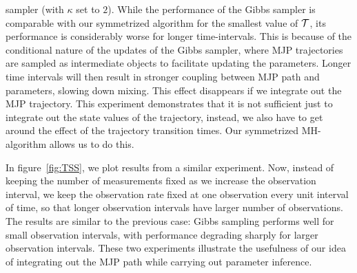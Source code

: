 {sampler (with $\kappa$ set to $2$). While the performance of the Gibbs sampler 
is comparable with our symmetrized algorithm for the smallest value of 
${\mathcal T}$, its performance is considerably worse for longer time-intervals. This is 
because of the conditional nature of the updates of the Gibbs sampler, where MJP
trajectories are sampled as intermediate objects to facilitate updating the
parameters. Longer time intervals will then result in stronger coupling between 
MJP path and parameters, slowing down mixing. This effect disappears if we 
integrate out the MJP trajectory. This experiment demonstrates that it
is not sufficient just to integrate out the state values of the trajectory, 
instead, we also have to get around the effect of the
trajectory transition times. Our symmetrized MH-algorithm allows us to do
this. 


In figure~\ref{fig:TSS}, we plot results from a similar experiment. Now,
instead of keeping the number of measurements fixed as we increase the 
observation interval, we keep the observation rate fixed at one observation 
every unit interval of time, so that longer observation intervals have larger 
number of observations. The results are similar to the previous case: Gibbs 
sampling performs well for small observation intervals, with performance 
degrading sharply for larger observation intervals. These two experiments 
illustrate the usefulness of our idea of integrating out the MJP path while 
carrying out parameter inference.

}

